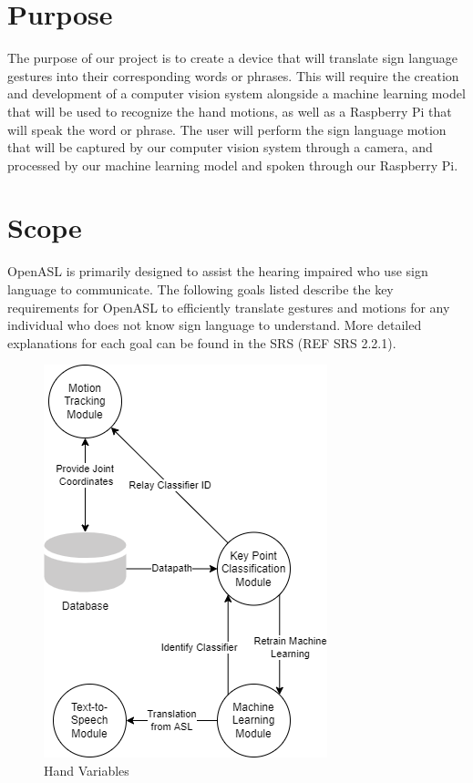 \documentclass[12pt, titlepage]{article}
\begin{document}
\section{Purpose}
The purpose of our project is to create a device that will translate sign language gestures into their corresponding words 
or phrases. This will require the creation and development of a computer vision system alongside a machine learning model that 
will be used to recognize the hand motions, as well as a Raspberry Pi that will speak the word or phrase. The user will perform 
the sign language motion that will be captured by our computer vision system through a camera, and processed by our machine learning 
model and spoken through our Raspberry Pi.


\section{Scope}
OpenASL is primarily designed to assist the hearing impaired who use sign language to communicate. The following goals listed 
describe the key requirements for OpenASL to efficiently translate gestures and motions for any individual who does not know sign language 
to understand. More detailed explanations for each goal can be found in the SRS (REF SRS 2.2.1).

\begin{figure}[H] 
\centering
\includegraphics[width=\textwidth,height=0.88\textheight,keepaspectratio]{SystemContextDiagram.jpg} 
\caption{Hand Variables} 
\label{Fig.System_Context_Diagram} 
\end{figure}
\end{document}
